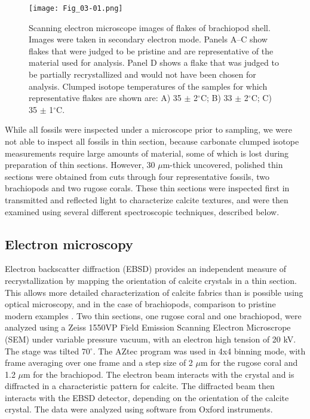 \documentclass[5p, authoryear]{elsarticle}
\begin{document}
\begin{figure}[tb]
\centering
\texttt{[image: Fig\_03-01.png]}
\caption{Scanning electron microscope images of flakes of brachiopod shell. Images were taken in secondary electron mode. Panels A--C show flakes that were judged to be pristine and are representative of the material used for analysis. Panel D shows a flake that was judged to be partially recrystallized and would not have been chosen for analysis. Clumped isotope temperatures of the samples for which representative flakes are shown are: A) 35 $\pm$ 2$^{\circ}$C; B) 33 $\pm$ 2$^{\circ}$C; C) 35 $\pm$ 1$^{\circ}$C.}
\label{flakes}
\end{figure}

While all fossils were inspected under a microscope prior to sampling, we were not able to inspect all fossils in thin section, because carbonate clumped isotope measurements require large amounts of material, some of which is lost during preparation of thin sections. However, 30 $\mu$m-thick uncovered, polished thin sections were obtained from cuts through four representative fossils, two brachiopods and two rugose corals. These thin sections were inspected first in transmitted and reflected light to characterize calcite textures, and were then examined using several different spectroscopic techniques, described below. 

\subsection{Electron microscopy}

Electron backscatter diffraction (EBSD) provides an independent measure of recrystallization by mapping the orientation of calcite crystals in a thin section. This allows more detailed characterization of calcite fabrics than is possible using optical microscopy, and in the case of brachiopods, comparison to pristine modern examples \citep{PerezHuerta2007}. Two thin sections, one rugose coral and one brachiopod, were analyzed using a Zeiss 1550VP Field Emission Scanning Electron Microscrope (SEM) under variable pressure vacuum, with an electron high tension of 20 kV. The stage was tilted 70$^{\circ}$. The AZtec program was used in 4x4 binning mode, with frame averaging over one frame and a step size of 2 $\mu$m for the rugose coral and 1.2 $\mu$m for the brachiopod. The electron beam interacts with the crystal and is diffracted in a characteristic pattern for calcite. The diffracted beam then interacts with the EBSD detector, depending on the orientation of the calcite crystal. The data were analyzed using software from Oxford instruments.
\end{document}
